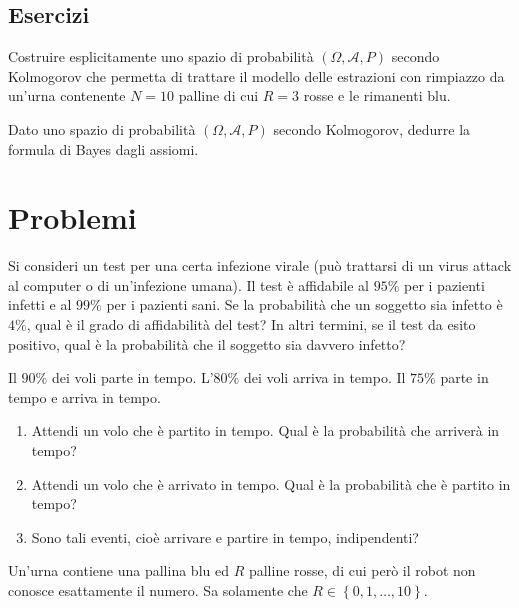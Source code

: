 \documentclass[
  italian,
  letterpaper,
]{book}
\providecommand{\tightlist}{%
  \setlength{\itemsep}{0pt}\setlength{\parskip}{0pt}}
\newcommand{\cur}[1]{\left\{ #1 \right\}}
\theoremstyle{definition}
\theoremstyle{remark}
\begin{document}
\subsection{Esercizi}\label{esercizi-8}

Costruire esplicitamente uno spazio di probabilità
\((\Omega, \mathcal{A}, P)\) secondo Kolmogorov che permetta di trattare
il modello delle estrazioni con rimpiazzo da un'urna contenente \(N=10\)
palline di cui \(R=3\) rosse e le rimanenti blu.

Dato uno spazio di probabilità \((\Omega, \mathcal{A}, P)\) secondo
Kolmogorov, dedurre la formula di Bayes dagli assiomi.

\section{Problemi}\label{problemi}

Si consideri un test per una certa infezione virale (può trattarsi di un
virus attack al computer o di un'infezione umana). Il test è affidabile
al \(95\%\) per i pazienti infetti e al \(99\%\) per i pazienti sani. Se
la probabilità che un soggetto sia infetto è \(4\%\), qual è il grado di
affidabilità del test? In altri termini, se il test da esito positivo,
qual è la probabilità che il soggetto sia davvero infetto?

Il \(90\%\) dei voli parte in tempo. L'\(80\%\) dei voli arriva in
tempo. Il \(75\%\) parte in tempo e arriva in tempo.

\begin{enumerate}
\def\labelenumi{\arabic{enumi}.}
\tightlist
\item
  Attendi un volo che è partito in tempo. Qual è la probabilità che
  arriverà in tempo?
\item
  Attendi un volo che è arrivato in tempo. Qual è la probabilità che è
  partito in tempo?
\item
  Sono tali eventi, cioè arrivare e partire in tempo, indipendenti?
\end{enumerate}

Un'urna contiene una pallina blu ed \(R\) palline rosse, di cui però il
robot non conosce esattamente il numero. Sa solamente che
\(R \in \cur{0,1, \ldots, 10}\).
\end{document}
